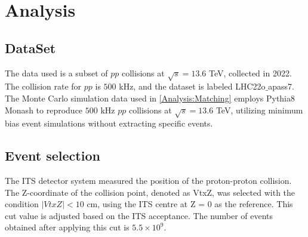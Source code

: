 \section{Analysis}
\label{Analysis}
    \subsection{DataSet}
    \label{DataSet}
        The data used is a subset of $pp$ collisions at $\sqrt{s} = 13.6$ TeV, collected in 2022. The collision rate for $pp$ is $500$ kHz, and the dataset is labeled LHC22o$\_$apass7.
        The Monte Carlo simulation data used in \ref{Analysis:Matching} employs Pythia8 Monash to reproduce $500$ kHz $pp$ collisions at $\sqrt{s} = 13.6$ TeV, utilizing minimum bias event simulations without extracting specific events.
        
    \subsection{Event selection}
    \label{Event_selection}
        The ITS detector system measured the position of the proton-proton collision. The Z-coordinate of the collision point, denoted as VtxZ, was selected with the condition $|VtxZ| < 10$ cm, using the ITS centre at Z = 0 as the reference. This cut value is adjusted based on the ITS acceptance. The number of events obtained after applying this cut is $5.5 \times 10^9$.\@

